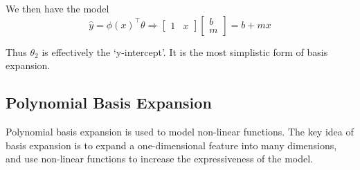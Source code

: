 \noindent We then have the model
\begin{equation}
    \hat{y} = \phi(x)^\top \theta \Rightarrow \begin{bmatrix} 1 & x \end{bmatrix}  \begin{bmatrix} b \\ m \end{bmatrix} = b + mx
\end{equation}

Thus $\theta_2$ is effectively the `y-intercept'. It is the most simplistic form of basis expansion.
\subsection{Polynomial Basis Expansion}
Polynomial basis expansion is used to model non-linear functions. The key idea of basis expansion is to expand a one-dimensional feature into many dimensions, and use non-linear functions to increase the expressiveness of the model.



